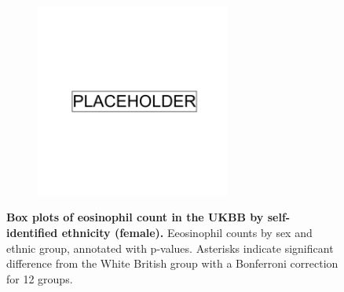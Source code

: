 \begin{figure}
    \centering
    \begin{subfigure}{\textwidth}
    \includegraphics[width=0.7\textwidth]{placeholder.png}
    \end{subfigure}
    \caption[Box plots of eosinophil count in the UKBB by self-identified ethnicity (female)]{\textbf{Box plots of eosinophil count in the UKBB by self-identified ethnicity (female).} Eeosinophil counts by sex and ethnic group, annotated with p-values. Asterisks indicate significant difference from the White British group with a Bonferroni correction for 12 groups.}
    \label{fig:supp_box_eosinophill_f}
\end{figure}

\newpage

